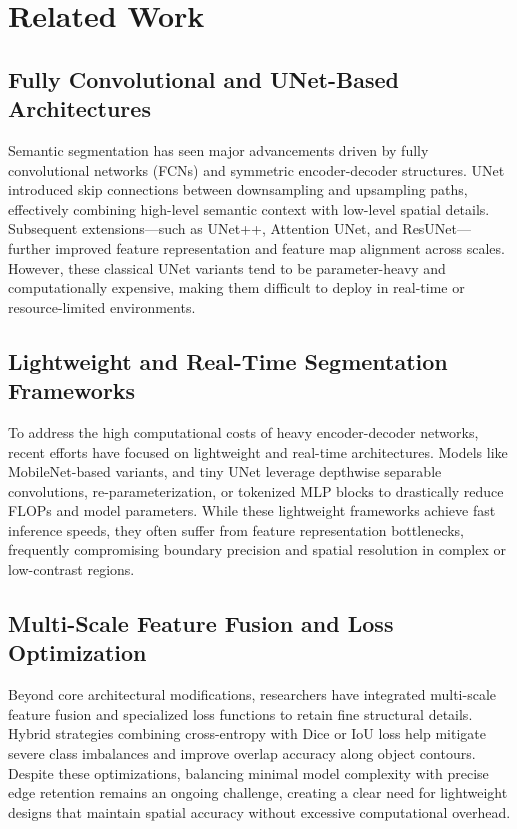 \documentclass[conference]{IEEEtran}
\begin{document}
\section{Related Work}

\subsection{Fully Convolutional and UNet-Based Architectures}
Semantic segmentation has seen major advancements driven by fully convolutional networks (FCNs) and symmetric encoder-decoder structures. UNet introduced skip connections between downsampling and upsampling paths, effectively combining high-level semantic context with low-level spatial details. Subsequent extensions---such as UNet++, Attention UNet, and ResUNet---further improved feature representation and feature map alignment across scales. However, these classical UNet variants tend to be parameter-heavy and computationally expensive, making them difficult to deploy in real-time or resource-limited environments.

\subsection{Lightweight and Real-Time Segmentation Frameworks}
To address the high computational costs of heavy encoder-decoder networks, recent efforts have focused on lightweight and real-time architectures. Models like MobileNet-based variants, and tiny UNet leverage depthwise separable convolutions, re-parameterization, or tokenized MLP blocks to drastically reduce FLOPs and model parameters. While these lightweight frameworks achieve fast inference speeds, they often suffer from feature representation bottlenecks, frequently compromising boundary precision and spatial resolution in complex or low-contrast regions.

\subsection{Multi-Scale Feature Fusion and Loss Optimization}
Beyond core architectural modifications, researchers have integrated multi-scale feature fusion and specialized loss functions to retain fine structural details. Hybrid strategies combining cross-entropy with Dice or IoU loss help mitigate severe class imbalances and improve overlap accuracy along object contours. Despite these optimizations, balancing minimal model complexity with precise edge retention remains an ongoing challenge, creating a clear need for lightweight designs that maintain spatial accuracy without excessive computational overhead.
\end{document}
